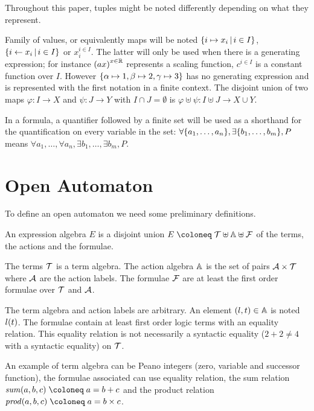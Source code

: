 \documentclass{article}
\begin{document}
Throughout this paper, tuples might be noted differently depending on what they represent.

Family of values, or equivalently maps will be noted \({\left\{i \mapsto x_i\,\middle|\, i \in I\right\}}\), \({\left\{i \gets x_i\,\middle|\, i \in I\right\}}\) or \(x_i^{i \in I}\).
The latter will only be used when there is a generating expression; for instance \({\left(ax\right)}^{x \in \mathbb{R}}\) represents a scaling function, \(c^{i \in I}\) is a constant function over \(I\).
However \({\left\{\alpha \mapsto 1, \beta \mapsto 2, \gamma \mapsto 3\right\}}\) has no generating expression and is represented with the first notation in a finite context.
The disjoint union of two maps \(\varphi: I \to X\) and \(\psi: J \to Y\) with \(I \cap J = \emptyset\) is \(\varphi \uplus \psi: I \uplus J \to X \cup Y\).

In a formula, a quantifier followed by a finite set will be used as a shorthand for the quantification on every variable in the set:
\(\forall {\left\{a_1, \dots, a_n\right\}}, \exists {\left\{b_1, \dots, b_m\right\}}, P\) means \(\forall a_1, \dots, \forall a_n, \exists b_1, \dots, \exists b_m, P\).


\section{Open Automaton}\label{sec:def}
To define an open automaton we need some preliminary definitions.
\begin{defi}
An expression algebra \(E\) is a disjoint union \(E \defobject \terms \uplus \actions \uplus \formulae\) of the terms, the actions and the formulae.

The terms \({\mathcal{T}}\) is a term algebra.
The action algebra \({\mathbb{A}}\) is the set of pairs \(\mathcal{A} \times {\mathcal{T}}\) where \(\mathcal{A}\) are the action labels.
The formulae \({\mathcal{F}}\) are at least the first order formulae over \({\mathcal{T}}\) and \(\mathcal{A}\).
\end{defi}
The term algebra and action labels are arbitrary.
An element \({\left(l, t\right)} \in {\mathbb{A}}\) is noted \(l{\left(t\right)}\).
The formulae contain at least first order logic terms with an equality relation.
This equality relation is not necessarily a syntactic equality (\(2 + 2 \neq 4\) with a syntactic equality) on \({\mathcal{T}}\).

An example of term algebra can be Peano integers (zero, variable and successor function), the formulae associated can use equality relation, the sum relation \(\mathit{sum}\mpar{a, b, c} \defobject a = b + c\) and the product relation \(\mathit{prod}\mpar{a, b, c} \defobject a = b \times c\).
\end{document}
